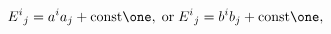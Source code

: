 \begin{equation}
{E^{i}}_{j} = {a^{i}} a_{j} + \mbox{const}\one, \; \mbox{or} \; {E^{i}}_{j} 
 = {b^{i}}b_{j} + \mbox{const}\one,
\label{eq:GelfandBF}
\end{equation}

